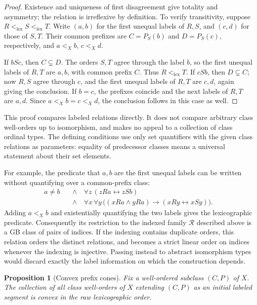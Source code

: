 \documentclass[11pt]{article}
\newtheorem{proposition}[proposition]{Proposition}
\theoremstyle{definition}
\theoremstyle{remark}
\newcommand{\lex}{\mathrm{lex}}
\begin{document}
\begin{proof}
Existence and uniqueness of first disagreement give totality and asymmetry;
the relation is irreflexive by definition.  To verify transitivity, suppose
\(R<_{\lex}S<_{\lex}T\).  Write \((a,b)\) for the first unequal
labels of \(R,S\), and \((c,d)\) for those of \(S,T\).  Their common
prefixes are \(C=P_S(b)\) and \(D=P_S(c)\), respectively, and
\(a<_Xb\), \(c<_Xd\).

If \(bSc\), then \(C\subsetneq D\).  The orders \(S,T\) agree
through the label \(b\), so the first unequal labels of \(R,T\) are
\(a,b\), with common prefix \(C\).  Thus \(R<_{\lex}T\).
If \(cSb\), then \(D\subsetneq C\); now \(R,S\) agree through
\(c\), and the first unequal labels of \(R,T\) are \(c,d\), again
giving the conclusion.  If \(b=c\), the prefixes coincide and the next
labels of \(R,T\) are \(a,d\).  Since
\(a<_Xb=c<_Xd\), the conclusion follows in this case as well.
\end{proof}

This proof compares labeled relations directly.  It does not compare
arbitrary class well-orders up to isomorphism, and makes no appeal to a
collection of class ordinal types.  The defining conditions use only set
quantifiers with the given class relations as parameters: equality of
predecessor classes means a universal statement about their set elements.

For example, the predicate that \(a,b\) are the first unequal labels can
be written without quantifying over a common-prefix class:
\[
 \begin{split}
 a\ne b\quad&\land\quad\forall z\,(zRa\leftrightarrow zSb)\\
 &\land\quad\forall x\,\forall y\,
 \bigl((xRa\land yRa)\longrightarrow(xRy\leftrightarrow xSy)\bigr).
 \end{split}
\]
Adding \(a<_Xb\) and existentially quantifying the two labels gives the
lexicographic predicate.  Consequently its restriction to the indexed
family \(\mathcal R\) described above is a GB class of pairs of indices.
If the indexing contains duplicate orders, this relation orders the distinct
relations, and becomes a strict linear order on indices whenever the
indexing is injective.  Passing instead to abstract isomorphism types would
discard exactly the label information on which the construction depends.

\begin{proposition}[Convex prefix cones]
\label{swo:cf:cones}
Fix a well-ordered subclass \((C,P)\) of \(X\).  The collection of all
class well-orders of \(X\) extending \((C,P)\) as an initial labeled
segment is convex in the raw lexicographic order.
\end{proposition}
\end{document}
